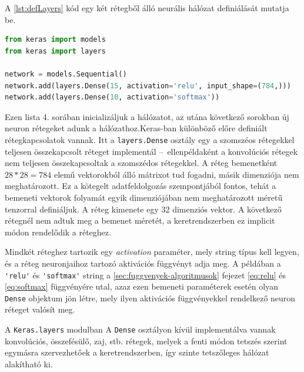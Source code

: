A \ref{lst:defLayers} kód egy két rétegből álló neurális hálózat definiálását mutatja be.
\begin{minipage}{\textwidth}
\begin{lstlisting}[language=Python, caption=Neurális hálózat rétegeinek definiálása]
from keras import models
from keras import layers

network = models.Sequential()
network.add(layers.Dense(15, activation='relu', input_shape=(784,)))
network.add(layers.Dense(10, activation='softmax'))
\end{lstlisting}\label{lst:defLayers}
\end{minipage}
Ezen lista 4. sorában inicializáljuk a hálózatot, az utána következő sorokban új neuron rétegeket adunk a hálózathoz.Keras-ban különböző előre definiált rétegkapcsolatok vannak. Itt a \verb|layers.Dense| osztály egy a szomszéos rétegekkel teljesen összekapcsolt réteget implementál --~ellenpéldaként a konvolúciós rétegek nem teljesen összekapcsoltak a szomszédos rétegekkel.
A réteg bemenetként $28 *28 = 784$ elemű vektorokból álló mátrixot tud fogadni, másik dimenziója nem meghatározott. Ez a kötegelt adatfeldolgozás szempontjából fontos, tehát a bemeneti vektorok folyamát egyik dimenziójában nem meghatározott méretű tenzorral definiáljuk. A réteg kimenete egy 32 dimenziós vektor. A következő rétegnél nem adtuk meg a bemenet méretét, a keretrendszerben ez implicit módon rendelődik a réteghez. 

Mindkét réteghez tartozik egy \emph{activation} paraméter, mely string típus kell legyen, és a réteg neuronjaihoz tartozó aktivációs függvényt adja meg. A példában a \verb|'relu'| és \verb|'softmax'| string a \ref{sec:fuggvenyek-algoritmusok} fejezet \eqref{eq:relu} és \eqref{eq:softmax} függvényére utal, azaz ezen bemeneti paraméterek esetén olyan \verb|Dense| objektum jön létre, mely ilyen aktivációs függvényekkel rendelkező neuron réteget valósít meg.

A \verb|Keras.layers| modulban A \verb|Dense| osztályon kívül implementálva vannak konvolúciós, összefésülő, zaj, stb. rétegek, melyek a fenti módon tetszés szerint egymásra szervezhetőek a keretrendszerben, így szinte tetszőleges hálózat alakítható ki.


